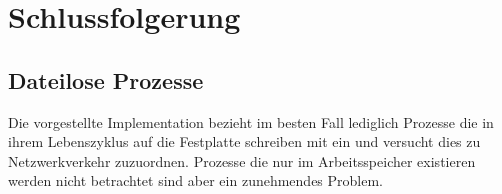 \chapter{Schlussfolgerung}%
\label{cha:conclusion}


\section{Dateilose Prozesse}
Die vorgestellte Implementation bezieht im besten Fall lediglich Prozesse die in ihrem Lebenszyklus auf die Festplatte schreiben mit ein und versucht dies zu Netzwerkverkehr zuzuordnen. Prozesse die nur im Arbeitsspeicher existieren werden nicht betrachtet sind aber ein zunehmendes Problem.
